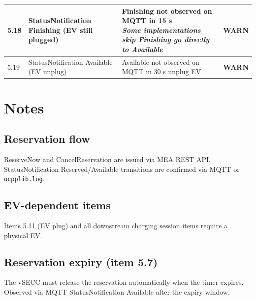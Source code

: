 \documentclass[10pt, a4paper]{article}
\begin{document}
\begin{longtable}{|L{1cm}|L{5.5cm}|M{7cm}|C{1.8cm}|}
\hline
\small 5.18 & \small StatusNotification Finishing (EV still plugged) & Finishing not observed on MQTT in 15 s{\newline\normalfont\footnotesize\itshape Some implementations skip Finishing  go directly to Available} & \textcolor{warnorange}{\textbf{WARN}} \\
\hline
\small 5.19 & \small StatusNotification Available (EV unplug) & Available not observed on MQTT in 30 s  unplug EV & \textcolor{warnorange}{\textbf{WARN}} \\
\hline
\end{longtable}
\normalsize

\section{Notes}

\subsection*{Reservation flow}
ReserveNow and CancelReservation are issued via MEA REST API.
StatusNotification Reserved/Available transitions are confirmed via MQTT or \texttt{ocpplib.log}.

\subsection*{EV-dependent items}
Items 5.11 (EV plug) and all downstream charging session items require a physical EV.

\subsection*{Reservation expiry (item 5.7)}
The vSECC must release the reservation automatically when the timer expires.
Observed via MQTT StatusNotification Available after the expiry window.
\end{document}
